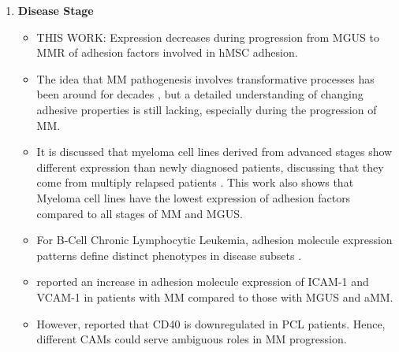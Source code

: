 \begin{enumerate}
      \item \textbf{Disease Stage}
            \begin{itemize}
                  \item THIS WORK: Expression decreases during progression from
                        \ac{MGUS} to \ac{MMR} of adhesion factors involved in hMSC
                        adhesion.
                  \item The idea that MM pathogenesis involves transformative
                        processes has been around for decades
                        \cite{hallekMultipleMyelomaIncreasing1998}, but a
                        detailed understanding of changing adhesive properties
                        is still lacking, especially during the progression of
                        MM.
                  \item It is discussed that myeloma cell lines derived from
                        advanced stages show different expression than newly
                        diagnosed patients, discussing that they come from
                        multiply relapsed patients
                        \cite{sarinEvaluatingEfficacyMultiple2020}. This work
                        also shows that Myeloma cell lines have the lowest
                        expression of adhesion factors compared to all stages of
                        \ac{MM} and \ac{MGUS}.
                  \item For B-Cell Chronic Lymphocytic Leukemia, adhesion
                        molecule expression patterns define distinct phenotypes in
                        disease subsets \cite{derossiAdhesionMoleculeExpression1993}.
                  \item \citet{terposIncreasedCirculatingVCAM12016} reported an
                        increase in adhesion molecule expression of ICAM-1 and
                        VCAM-1 in patients with \ac{MM} compared to those with
                        \ac{MGUS} and \ac{aMM}.
                  \item However, \citet{perez-andresClonalPlasmaCells2005}
                        reported that CD40 is downregulated in \ac{PCL}
                        patients. Hence, different \acp{CAM} could serve
                        ambiguous roles in \ac{MM} progression.
            \end{itemize}

\end{enumerate}



